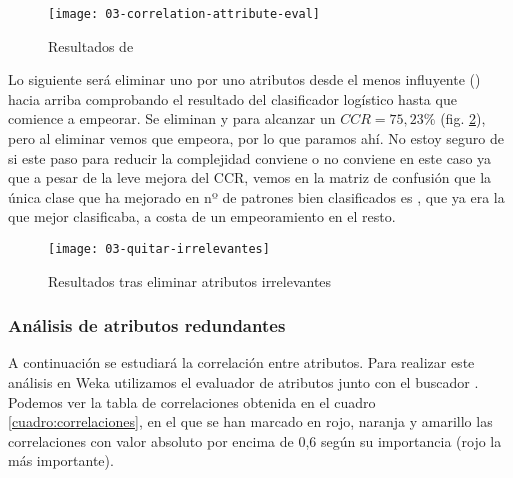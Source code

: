 \begin{figure}[H]
    \centering
    \texttt{[image: 03-correlation-attribute-eval]}
    \caption{Resultados de }
    \label{fig:correlation-attribute-eval}
\end{figure}

Lo siguiente será eliminar uno por uno atributos desde el menos influyente () hacia arriba comprobando el resultado del clasificador logístico hasta que comience a empeorar. Se eliminan  y  para alcanzar un $CCR=75,23\%$ (fig. \ref{fig:03-quitar-irrelevantes}), pero al eliminar  vemos que empeora, por lo que paramos ahí. No estoy seguro de si este paso para reducir la complejidad conviene o no conviene en este caso ya que a pesar de la leve mejora del CCR, vemos en la matriz de confusión que la única clase que ha mejorado en nº de patrones bien clasificados es , que ya era la que mejor clasificaba, a costa de un empeoramiento en el resto. 

\begin{figure}[H]
    \centering
    \texttt{[image: 03-quitar-irrelevantes]}
    \caption{Resultados tras eliminar atributos irrelevantes}
    \label{fig:03-quitar-irrelevantes}
\end{figure}


\subsubsection{Análisis de atributos redundantes}
A continuación se estudiará la correlación entre atributos. Para realizar este análisis en Weka utilizamos el evaluador de atributos  junto con el buscador . Podemos ver la tabla de correlaciones obtenida en el cuadro \ref{cuadro:correlaciones}, en el que se han marcado en rojo, naranja y amarillo las correlaciones con valor absoluto por encima de 0,6 según su importancia (rojo la más importante).

